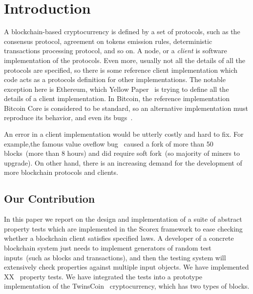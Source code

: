 
\section{Introduction}

A blockchain-based cryptocurrency is defined by a set of protocols, such as the consensus protocol, agreement on tokens emission rules, deterministic transactions processing protocol, and so on. A node, or a {\em client} is software implementation of the protocols. Even more, usually not all the details of all the protocols are specified, so there is some reference client implementation which code acts as a protocols definition for other implementations. The notable exception here is Ethereum, which Yellow Paper~\cite{ethyp} is trying to define all the details of a client implementation. In Bitcoin, the reference implementation Bitcoin Core is considered to be standard, so an alternative implementation must reproduce its behavior, and even its bugs~\cite{bitbugs}. 

An error in a client implementation would be utterly costly and hard to fix. For example,the famous value oveflow bug~\cite{overflow} caused a fork of more than 50 blocks~(more than 8 hours) and did require soft fork~(so majority of miners to upgrade). On other hand, there is an increasing demand for the development of more blockchain protocols and clients. 


\subsection{Our Contribution}

In this paper we report on the design and implementation of a suite of abstract property tests which are implemented in the Scorex framework to ease checking whether a blockchain client satisfies specified laws. A developer of a concrete blockchain system just needs to implement generators of random test inputs~(such as blocks and transactions), and then the testing system will extensively check properties against multiple input objects. We have implemented XX~ property tests. We have integrated the tests into a prototype implementation of the TwinsCoin~ cryptocurrency, which has two types of blocks.  
